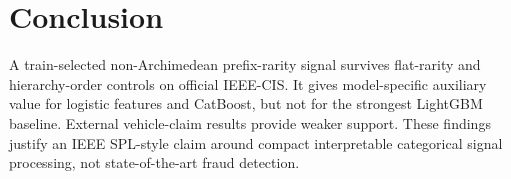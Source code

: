 \documentclass[journal]{IEEEtran}
\begin{document}
\section{Conclusion}
A train-selected non-Archimedean prefix-rarity signal survives flat-rarity and hierarchy-order controls on official IEEE-CIS. It gives model-specific auxiliary value for logistic features and CatBoost, but not for the strongest LightGBM baseline. External vehicle-claim results provide weaker support. These findings justify an IEEE SPL-style claim around compact interpretable categorical signal processing, not state-of-the-art fraud detection.



\end{document}

